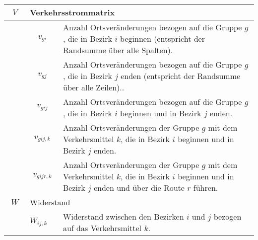 \begin{table}[htbp]
\begin{tabular}{|p{3cm}|p{3cm}|p{3cm}|}
\begin{align}
V
\end{align}
 & \multicolumn{2}{|l|}{Verkehrsstrommatrix}\\\hline
 & 
\begin{align}
{{v}_{gi}}
\end{align}
 & Anzahl Ortsveränderungen bezogen auf die Gruppe $g$, die in Bezirk $i$ beginnen (entspricht der Randsumme über alle Spalten).\\\hline
 & 
\begin{align}
{{v}_{gj}}
\end{align}
 & Anzahl Ortsveränderungen bezogen auf die Gruppe $g$, die in Bezirk $j$ enden (entspricht der Randsumme über alle Zeilen)..\\\hline
 & 
\begin{align}
{{v}_{gij}}
\end{align}
 & Anzahl Ortsveränderungen bezogen auf die Gruppe $g$, die in Bezirk $i$ beginnen und in Bezirk $j$ enden.\\\hline
 & 
\begin{align}
{{v}_{gij,k}}
\end{align}
 & Anzahl Ortsveränderungen der Gruppe $g$ mit dem Verkehrsmittel $k$, die in Bezirk $i$ beginnen und in Bezirk $j$ enden.\\\hline
 & 
\begin{align}
{{v}_{gijr,k}}
\end{align}
 & Anzahl Ortsveränderungen der Gruppe $g$ mit dem Verkehrsmittel $k$, die in Bezirk $i$ beginnen und in Bezirk $j$ enden und über die Route $r$ führen.\\\hline

\begin{align}
W
\end{align}
 & \multicolumn{2}{|l|}{Widerstand}\\\hline
 & ${{W}_{ij,k}}$  & Widerstand zwischen den Bezirken $i$ und $j$ bezogen auf das Verkehrsmittel $k$.\\\hline
\end{tabular}
\end{table}

\newpage
~\\

\printbibliography
